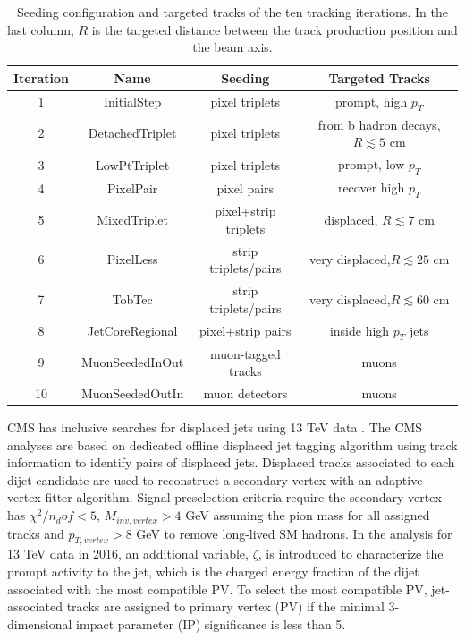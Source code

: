 \begin{table}[!htbp]
    \centering
    \caption{Seeding configuration and targeted tracks of the ten tracking iterations. In the last column, $R$ is the targeted distance between the track production position and the beam axis.}
    \begin{tabular}{cccc}
    \hline
    Iteration  &  Name & Seeding  & Targeted Tracks \\
    \hline
    1  &  InitialStep       &  pixel triplets       & prompt, high $p_T$ \\
    2  &  DetachedTriplet   &  pixel triplets       & from b hadron decays,$R \apprle 5$ cm \\
    3  &  LowPtTriplet      &  pixel triplets       & prompt, low $p_T$ \\
    4  &  PixelPair         &  pixel pairs          & recover high $p_T$ \\
    5  &  MixedTriplet      &  pixel+strip triplets & displaced, $R \apprle 7$ cm \\
    6  &  PixelLess         &  strip triplets/pairs & very displaced,$R \apprle 25$ cm \\
    7  &  TobTec            &  strip triplets/pairs & very displaced,$R \apprle 60$ cm \\
    8  &  JetCoreRegional   &  pixel+strip pairs    & inside high $p_T$  jets   \\
    9  &  MuonSeededInOut   &  muon-tagged tracks   & muons  \\
    10 &  MuonSeededOutIn   &  muon detectors       & muons \\
    \hline
    \end{tabular}
    \label{tab:my_label}
\end{table}

CMS has inclusive searches for displaced jets using 13 TeV data \cite{Sirunyan:2018vlw,Sirunyan:2018pwn}. The CMS analyses are based on dedicated offline displaced jet tagging algorithm using track information to identify pairs of displaced jets. Displaced tracks associated to each dijet candidate are used to reconstruct a secondary vertex with an adaptive vertex fitter algorithm. Signal preselection criteria require the secondary vertex has $\chi^2/n_dof < 5$, $M_{inv,vertex} > 4$ GeV assuming the pion mass for all assigned tracks and $p_{T,vertex} > 8$ GeV to remove long-lived SM hadrons. In the analysis for 13 TeV data in 2016, an additional variable, $\zeta$, is introduced to characterize the prompt activity to the jet, which is the charged energy fraction of the dijet associated with the most compatible PV. To select the most compatible PV, jet-associated tracks are assigned to primary vertex (PV) if the minimal 3-dimensional impact parameter (IP) significance is less than 5. 


